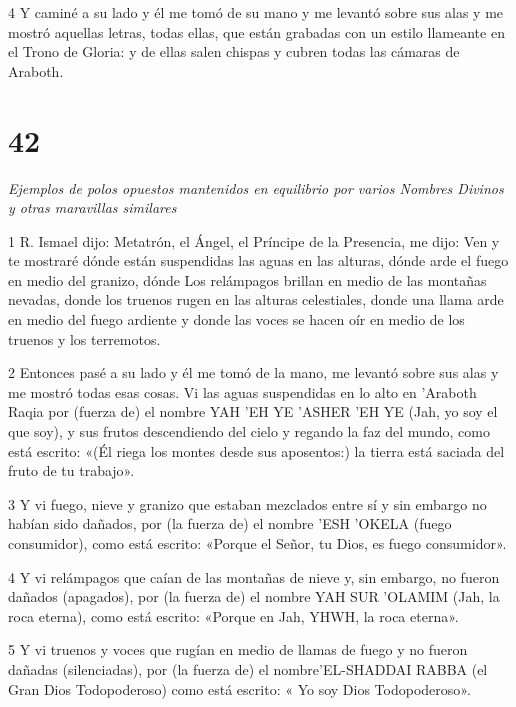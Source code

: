 \par 4 Y caminé a su lado y él me tomó de su mano y me levantó sobre sus alas y me mostró aquellas letras, todas ellas, que están grabadas con un estilo llameante en el Trono de Gloria: y de ellas salen chispas y cubren todas las cámaras de Araboth.


\chapter{42}

\par \textit{Ejemplos de polos opuestos mantenidos en equilibrio por varios Nombres Divinos y otras maravillas similares}

\par 1 R. Ismael dijo: Metatrón, el Ángel, el Príncipe de la Presencia, me dijo: Ven y te mostraré dónde están suspendidas las aguas en las alturas, dónde arde el fuego en medio del granizo, dónde Los relámpagos brillan en medio de las montañas nevadas, donde los truenos rugen en las alturas celestiales, donde una llama arde en medio del fuego ardiente y donde las voces se hacen oír en medio de los truenos y los terremotos.

\par 2 Entonces pasé a su lado y él me tomó de la mano, me levantó sobre sus alas y me mostró todas esas cosas. Vi las aguas suspendidas en lo alto en 'Araboth Raqia por (fuerza de) el nombre YAH 'EH YE 'ASHER 'EH YE (Jah, yo soy el que soy), y sus frutos descendiendo del cielo y regando la faz del mundo, como está escrito: «(Él riega los montes desde sus aposentos:) la tierra está saciada del fruto de tu trabajo».

\par 3 Y vi fuego, nieve y granizo que estaban mezclados entre sí y sin embargo no habían sido dañados, por (la fuerza de) el nombre 'ESH 'OKELA (fuego consumidor), como está escrito: «Porque el Señor, tu Dios, es fuego consumidor».

\par 4 Y vi relámpagos que caían de las montañas de nieve y, sin embargo, no fueron dañados (apagados), por (la fuerza de) el nombre YAH SUR 'OLAMIM (Jah, la roca eterna), como está escrito: «Porque en Jah, YHWH, la roca eterna».

\par 5 Y vi truenos y voces que rugían en medio de llamas de fuego y no fueron dañadas (silenciadas), por (la fuerza de) el nombre'EL-SHADDAI RABBA (el Gran Dios Todopoderoso) como está escrito: « Yo soy Dios Todopoderoso».

